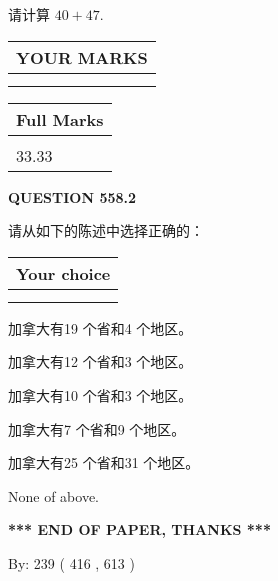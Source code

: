 \documentclass{ctexart}
\begin{document}
  
 
请计算 $ %
40 +  %
47 $.
 

 

 
  
\vspace{0.2in}
  
\noindent\begin{tabular}{|l|}
\hline
 YOUR MARKS  \\
\hline
 \\ 
 \\ 
\hline
\end{tabular}
\hspace{0.05in} \begin{tabular}{|l|}
\hline
 Full Marks  \\
\hline
 \\ 
33.33 \\
\hline
\end{tabular}
{\textbf{\Large{QUESTION
558.2 
}}}
  
  
请从如下的陈述中选择正确的：
  
  
\noindent\hspace{3.0in} \begin{tabular}{|l|}
\hline
Your choice \\
\hline
 \\ 
 \\ 
\hline
\end{tabular}
  
  
 
 
加拿大有19 个省和4 个地区。
 
 
加拿大有12 个省和3 个地区。
 
 
加拿大有10 个省和3 个地区。
 
 
加拿大有7 个省和9 个地区。
 
 
加拿大有25 个省和31 个地区。
 
 
 None of above.
 
 
   
   
 \vspace{0.2in}
 
   
   
   
   
\vspace{1.0in} 
{\textbf{\large{ *** END OF PAPER, THANKS *** }}} 
   
   
\hspace{1.0in} By: 
 239 ( 416 ,  613 )
   
\end{document}
